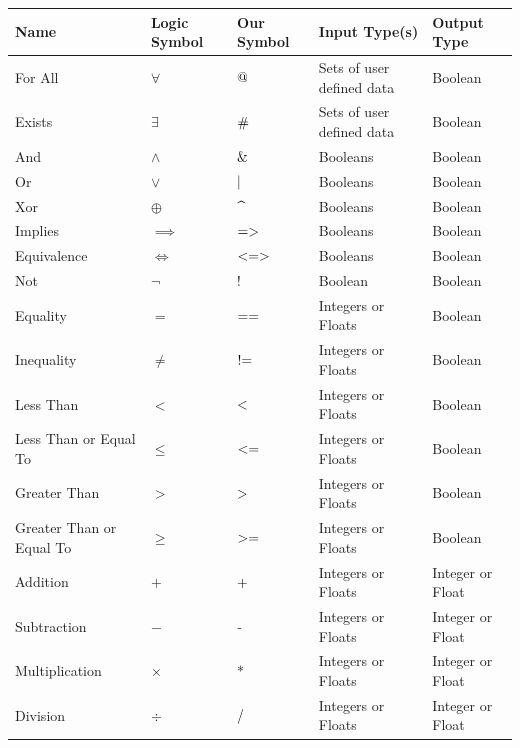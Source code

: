 \begin{table}[H]
\centering
\begin{tabular}{| l | l | l | l | l |}
\hline
Name & Logic Symbol & Our Symbol & Input Type(s) & Output Type\\
\hline

For All & $\forall$ & $\textnormal{@}$ & Sets of user defined data & Boolean\\
Exists & $\exists$ & $\textnormal{\#}$ & Sets of user defined data & Boolean\\

\hline

And & $\land$ & $\textnormal{\&}$ & Booleans & Boolean\\
Or & $\lor$ & $\textnormal{\textbar}$ & Booleans & Boolean\\
Xor & $\oplus$ & $\textnormal{\textasciicircum}$ & Booleans & Boolean\\
Implies & $\implies$ & $\textnormal{=\textgreater}$ & Booleans & Boolean\\
Equivalence & $\iff$ & $\textnormal{\textless=\textgreater}$ & Booleans & Boolean\\

\hline

Not & $\lnot$ & $\textnormal{!}$ & Boolean & Boolean\\

\hline

Equality & $=$ & $\textnormal{==}$ & Integers or Floats & Boolean\\
Inequality & $\not=$ & $\textnormal{!=}$ & Integers or Floats & Boolean\\
Less Than & $<$ & $\textnormal{\textless}$ & Integers or Floats & Boolean\\
Less Than or Equal To & $\leq$ & $\textnormal{\textless=}$ & Integers or Floats & Boolean\\
Greater Than & $>$ & $\textnormal{\textgreater}$ & Integers or Floats & Boolean\\
Greater Than or Equal To & $\geq$ & $\textnormal{\textgreater=}$ & Integers or Floats & Boolean\\

\hline

Addition & $+$ & $\textnormal{+}$ & Integers or Floats & Integer or Float\\
Subtraction & $-$ & $\textnormal{-}$ & Integers or Floats & Integer or Float\\
Multiplication & $\times$ & $\textnormal{*}$ & Integers or Floats & Integer or Float\\
Division & $\div$ & $\textnormal{/}$ & Integers or Floats & Integer or Float\\

\hline
\end{tabular}
\end{table}


